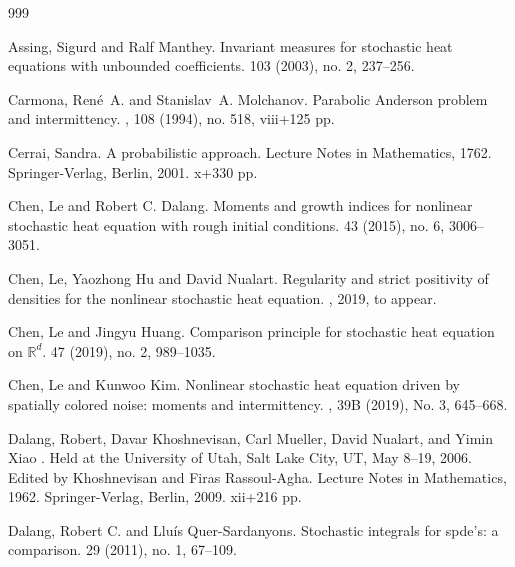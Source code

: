 \documentclass[a4paper,11pt]{article}%
\numberwithin{equation}{section}
\theoremstyle{plain}
\theoremstyle{definition}
\newcommand{\R}{\mathbb{R}}
\begin{document}
\begin{small}
	\begin{thebibliography}{999}

		Assing, Sigurd and Ralf Manthey.
		\newblock Invariant measures for stochastic heat equations with unbounded coefficients.
		 103 (2003), no. 2, 237--256.

		Carmona, Ren\'e~A.  and Stanislav~A. Molchanov.
		\newblock Parabolic Anderson problem and intermittency.
		, 108 (1994), no. 518, viii+125 pp.

		Cerrai, Sandra.
		\newblock A probabilistic approach. Lecture Notes in Mathematics, 1762. Springer-Verlag, Berlin, 2001. x+330 pp.

		Chen, Le and Robert C. Dalang.
		\newblock Moments and growth indices for nonlinear stochastic heat equation
		with rough initial conditions.
		  43 (2015), no. 6, 3006--3051.

		Chen, Le, Yaozhong Hu and David Nualart.
		\newblock Regularity and strict positivity of densities for the nonlinear stochastic heat equation.
		, 2019, to appear.

		Chen, Le and Jingyu Huang.
		\newblock Comparison principle for stochastic heat equation on $\R^d$.
		  47 (2019), no. 2, 989--1035.

		Chen, Le and Kunwoo Kim.
		\newblock Nonlinear stochastic heat equation driven by spatially colored noise: moments and intermittency.
		, 39B (2019), No. 3, 645--668.

		 Dalang, Robert, Davar Khoshnevisan, Carl
		Mueller, David Nualart, and Yimin Xiao
		.
		\newblock Held at the University of Utah, Salt Lake City, UT, May 8–19, 2006.
		Edited by  Khoshnevisan and Firas Rassoul-Agha. Lecture Notes in Mathematics,
		1962.
		\newblock Springer-Verlag, Berlin, 2009. xii+216 pp.

		Dalang, Robert C. and Llu\'is Quer-Sardanyons.
		\newblock Stochastic integrals for spde's: a comparison.
		 29 (2011), no. 1, 67--109.


\end{thebibliography}
\end{small}
\end{document}
